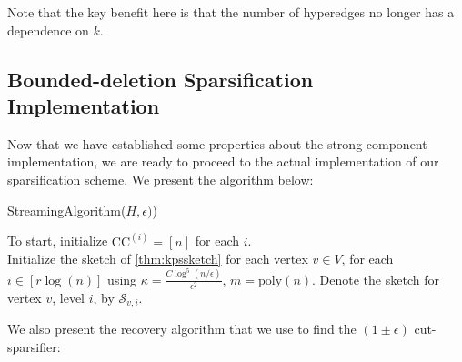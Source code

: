 \documentclass[11pt]{article}
\theoremstyle{definition}
\newcommand{\eps}{\epsilon}
\begin{document}
Note that the key benefit here is that the number of hyperedges no longer has a dependence on $k$.

\subsection{Bounded-deletion Sparsification Implementation}

Now that we have established some properties about the strong-component implementation, we are ready to proceed to the actual implementation of our sparsification scheme. We present the algorithm below:

\begin{algorithm}[H]
	\caption{StreamingAlgorithm($H, \eps)$)}\label{alg:buildingSketchBounded}
	To start, initialize $\mathrm{CC}^{(i)} = [n]$ for each $i$. \\
	Initialize the sketch of \cref{thm:kpssketch} for each vertex $v \in V$, for each $i \in [r \log(n)]$ using $\kappa  = \frac{C \log^5(n / \eps)}{ \eps^2}$, $m = \mathrm{poly}(n)$. Denote the sketch for vertex $v$, level $i$, by $\mathcal{S}_{v,i}$. \\
\end{algorithm}

We also present the recovery algorithm that we use to find the $(1 \pm \eps)$ cut-sparsifier:
\end{document}
